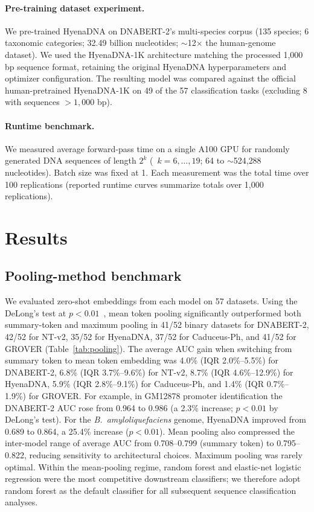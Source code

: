 \documentclass[11pt,a4paper]{article}
\begin{document}
\paragraph{Pre-training dataset experiment.} We pre-trained HyenaDNA on DNABERT-2's multi-species corpus (135 species; 6 taxonomic categories; 32.49 billion nucleotides; $\sim$12$\times$ the human-genome dataset). We used the HyenaDNA-1K architecture matching the processed 1{,}000 bp sequence format, retaining the original HyenaDNA hyperparameters and optimizer configuration. The resulting model was compared against the official human-pretrained HyenaDNA-1K on 49 of the 57 classification tasks (excluding 8 with sequences $>1{,}000$ bp).
\paragraph{Runtime benchmark.} We measured average forward-pass time on a single A100 GPU for randomly generated DNA sequences of length $2^k$ (\ $k=6,\ldots,19$; 64 to $\sim$524{,}288 nucleotides). Batch size was fixed at 1. Each measurement was the total time over 100 replications (reported runtime curves summarize totals over 1{,}000 replications).

\section{Results}

\subsection{Pooling-method benchmark}
We evaluated zero-shot embeddings from each model on 57 datasets. Using the DeLong's test at $p<0.01$~\citep{delong1988comparing}, mean token pooling significantly outperformed both summary-token and maximum pooling in 41/52 binary datasets for DNABERT-2, 42/52 for NT-v2, 35/52 for HyenaDNA, 37/52 for Caduceus-Ph, and 41/52 for GROVER (Table~\ref{tab:pooling}). The average AUC gain when switching from summary token to mean token embedding was 4.0\% (IQR 2.0\%--5.5\%) for DNABERT-2, 6.8\% (IQR 3.7\%--9.6\%) for NT-v2, 8.7\% (IQR 4.6\%--12.9\%) for HyenaDNA, 5.9\% (IQR 2.8\%--9.1\%) for Caduceus-Ph, and 1.4\% (IQR 0.7\%--1.9\%) for GROVER. For example, in GM12878 promoter identification the DNABERT-2 AUC rose from 0.964 to 0.986 (a 2.3\% increase; $p<0.01$ by DeLong's test). For the \emph{B.~amyloliquefaciens} genome, HyenaDNA improved from 0.689 to 0.864, a 25.4\% increase ($p<0.01$). Mean pooling also compressed the inter-model range of average AUC from 0.708--0.799 (summary token) to 0.795--0.822, reducing sensitivity to architectural choices. Maximum pooling was rarely optimal. Within the mean-pooling regime, random forest and elastic-net logistic regression were the most competitive downstream classifiers; we therefore adopt random forest as the default classifier for all subsequent sequence classification analyses.
\end{document}
